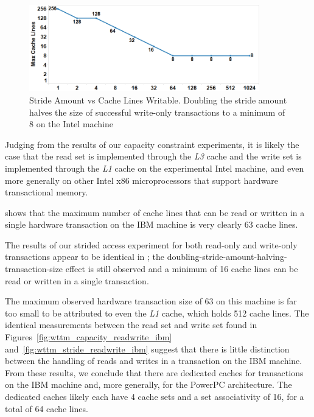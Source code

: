 \begin{figure}[]%
\centering
\includegraphics[width=100mm]{images/wttm_stride_write_intel}
\caption{Stride Amount vs Cache Lines Writable. 
Doubling the stride amount halves the size of successful write-only
transactions to a minimum of 8 on the Intel machine}
\label{fig:wttm_stride_write_intel}
\end{figure}

Judging from the results of our capacity constraint experiments, it is likely
the case that the read set is implemented through the \textit{L3} cache and the
write set is implemented through the \textit{L1} cache on the experimental Intel
machine, and even more generally on other Intel x86 microprocessors that support
hardware transactional memory.


 shows that the maximum number of
cache lines that can be read or written in a single hardware transaction on the
IBM machine is very clearly 63 cache lines.

The results of our strided access experiment for both read-only and write-only
transactions appear to be identical in
; the
doubling-stride-amount-halving-transaction-size effect is still observed and a
minimum of 16 cache lines can be read or written in a single transaction.

The maximum observed hardware transaction size of 63 on this machine is far too
small to be attributed to even the \textit{L1} cache, which holds 512 cache
lines. The identical measurements between the read set and write set found in
Figures~\ref{fig:wttm_capacity_readwrite_ibm}
and~\ref{fig:wttm_stride_readwrite_ibm} suggest that there is little distinction
between the handling of reads and writes in a transaction on the IBM machine.
From these results, we conclude that there are dedicated caches for transactions
on the IBM machine and, more generally, for the PowerPC architecture. The
dedicated caches likely each have 4 cache sets and a set associativity of 16,
for a total of 64 cache lines.


